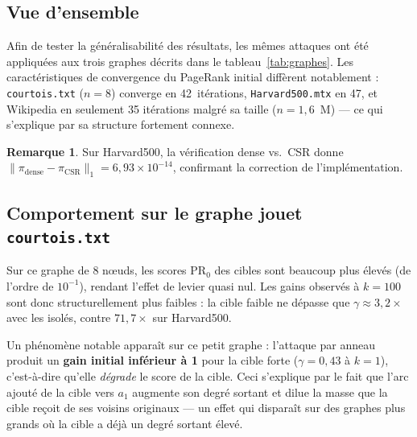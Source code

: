 \documentclass[12pt,a4paper]{article}
\newcommand{\PR}{\mathrm{PR}}
\theoremstyle{definition}
\newtheorem{remarque}{Remarque}[section]
\begin{document}
\subsection{Vue d'ensemble}

Afin de tester la g\'{e}n\'{e}ralisabilit\'{e} des r\'{e}sultats, les m\^{e}mes attaques ont
\'{e}t\'{e} appliqu\'{e}es aux trois graphes d\'{e}crits dans le tableau~\ref{tab:graphes}.
Les caract\'{e}ristiques de convergence du PageRank initial diff\`{e}rent notablement :
\texttt{courtois.txt} ($n=8$) converge en 42~it\'{e}rations,
\texttt{Harvard500.mtx} en 47, et Wikipedia en seulement 35 it\'{e}rations
malgr\'{e} sa taille ($n = 1{,}6$~M) --- ce qui s'explique par sa structure
fortement connexe.

\begin{remarque}
Sur Harvard500, la vérification dense vs.\ CSR donne
$\|\pi_\text{dense} - \pi_\text{CSR}\|_1 = 6{,}93 \times 10^{-14}$,
confirmant la correction de l'impl\'{e}mentation.
\end{remarque}

\subsection{Comportement sur le graphe jouet \texttt{courtois.txt}}

Sur ce graphe de 8 n\oe{}uds, les scores $\PR_0$ des cibles sont beaucoup
plus \'{e}lev\'{e}s (de l'ordre de $10^{-1}$), rendant l'effet de levier quasi nul.
Les gains observ\'{e}s \`{a} $k=100$ sont donc structurellement plus faibles :
la cible faible ne d\'{e}passe que $\gamma \approx 3{,}2\times$ avec les isol\'{e}s,
contre $71{,}7\times$ sur Harvard500.

Un ph\'{e}nom\`{e}ne notable appara\^{i}t sur ce petit graphe : l'attaque par
anneau produit un \textbf{gain initial inf\'{e}rieur \`{a} 1} pour la cible forte
($\gamma = 0{,}43$ \`{a} $k=1$), c'est-\`{a}-dire qu'elle \emph{d\'{e}grade} le score
de la cible. Ceci s'explique par le fait que l'arc ajout\'{e} de la cible vers
$a_1$ augmente son degr\'{e} sortant et dilue la masse que la cible re\c{c}oit
de ses voisins originaux --- un effet qui dispara\^{i}t sur des graphes plus
grands o\`{u} la cible a d\'{e}j\`{a} un degr\'{e} sortant \'{e}lev\'{e}.
\end{document}
